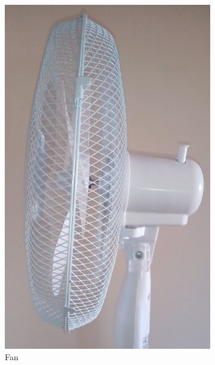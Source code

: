 \begin{figure}[ht]
    \centering
    \begin{subfigure}[b]{0.17\textwidth}
    		\centering
        \includegraphics[width=\textwidth]{assets/design/machine-fan.jpg}
        \caption{\footnotesize Fan}
        \label{fig:machine:fan}
    \end{subfigure}
    \hfill
    \begin{subfigure}[b]{0.17\textwidth}
    		\centering

\end{subfigure}
\end{figure}
